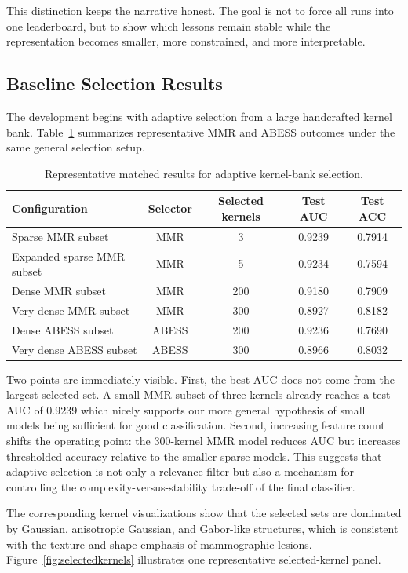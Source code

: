 \documentclass{cernatsnote}
\let\oldsubsection\subsection
\let\oldsubsubsection\subsubsection
\let\section\oldsubsection
\let\subsection\oldsubsubsection
\begin{document}
This distinction keeps the narrative honest. The goal is not to force all runs into one leaderboard, but to show which lessons remain stable while the representation becomes smaller, more constrained, and more interpretable.

\section{Baseline Selection Results}
The development begins with adaptive selection from a large handcrafted kernel bank. Table~\ref{tab:selectionresults} summarizes representative MMR and ABESS outcomes under the same general selection setup.

\begin{table}[H]
\centering
\caption{Representative matched results for adaptive kernel-bank selection.}
\label{tab:selectionresults}
\begin{tabular}{lcccc}
\toprule
Configuration & Selector & Selected kernels & Test AUC & Test ACC \\
\midrule
Sparse MMR subset & MMR & 3 & 0.9239 & 0.7914 \\
Expanded sparse MMR subset & MMR & 5 & 0.9234 & 0.7594 \\
Dense MMR subset & MMR & 200 & 0.9180 & 0.7909 \\
Very dense MMR subset & MMR & 300 & 0.8927 & 0.8182 \\
Dense ABESS subset & ABESS & 200 & 0.9236 & 0.7690 \\
Very dense ABESS subset & ABESS & 300 & 0.8966 & 0.8032 \\
\bottomrule
\end{tabular}
\end{table}

Two points are immediately visible. First, the best AUC does not come from the largest selected set. A small MMR subset of three kernels already reaches a test AUC of 0.9239 which nicely supports our more general hypothesis of small models being sufficient for good classification. Second, increasing feature count shifts the operating point: the 300-kernel MMR model reduces AUC but increases thresholded accuracy relative to the smaller sparse models. This suggests that adaptive selection is not only a relevance filter but also a mechanism for controlling the complexity-versus-stability trade-off of the final classifier.

The corresponding kernel visualizations show that the selected sets are dominated by Gaussian, anisotropic Gaussian, and Gabor-like structures, which is consistent with the texture-and-shape emphasis of mammographic lesions. Figure~\ref{fig:selectedkernels} illustrates one representative selected-kernel panel.
\end{document}
